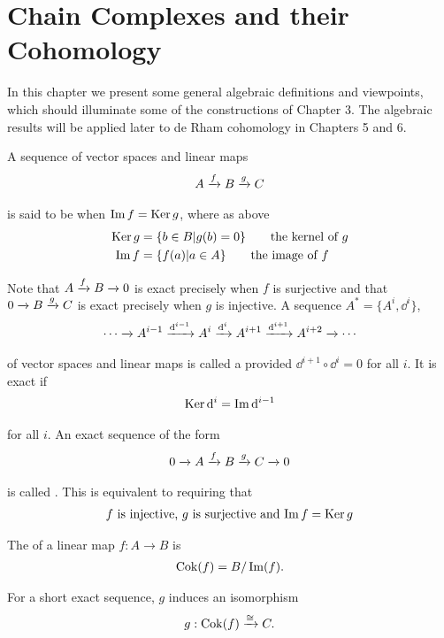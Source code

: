 \chapter{Chain Complexes and their Cohomology}
In this chapter we present some general algebraic definitions and viewpoints,
which should illuminate some of the constructions of Chapter 3. The algebraic
results will be applied later to de Rham cohomology in Chapters 5 and 6.

A sequence of vector spaces and linear maps
\begin{align}\label{eq:4-1}
  A \xrightarrow[]{f} B \xrightarrow[]{g} C
\end{align}

is said to be  when $\operatorname{Im} f = \operatorname{Ker} g$, where as above
\begin{align*}
  \operatorname{Ker} g & = \{b\in B | g(b) = 0\}\qquad \text{the kernel of } g \\
  \operatorname{Im} f  & = \{f(a) | a\in A\}\qquad \text{the image of } f
\end{align*}

Note that $A\xrightarrow[]{f}B\xrightarrow[]{}0$ is exact precisely when $f$ is surjective and that $0\xrightarrow[]{}B\xrightarrow[]{g}C$ is exact
precisely when $g$ is injective. A sequence $A^* = \{A^i, \dd^i\}$,
\begin{align}\label{eq:4-2}
  \cdots \xrightarrow[]{} A^{i-1}\xrightarrow[]{\mathrm{d}^{i-1}} A^i \xrightarrow[]{\mathrm{d}^i} A^{i+1} \xrightarrow[]{\mathrm{d}^{i+1}} A^{i+2}\xrightarrow[]{}\cdots
\end{align}

of vector spaces and linear maps is called a  provided $\dd^{i+1}\circ\dd^i = 0$
for all $i$. It is exact if
\begin{align*}
  \operatorname{Ker} \mathrm{d}^i = \operatorname{Im} \mathrm{d}^{i-1}
\end{align*}

for all $i$. An exact sequence of the form
\begin{align}\label{eq:4-3}
  0\xrightarrow[]{}A\xrightarrow[]{f}B\xrightarrow[]{g}C\xrightarrow[]{}0
\end{align}

is called . This is equivalent to requiring that
\begin{align*}
  \text{$f$ is injective, $g$ is surjective and $\operatorname{Im} f = \operatorname{Ker} g$}
\end{align*}

The  of a linear map $f:A\to B$ is
\begin{align*}
  \operatorname{Cok}(f) = B/\operatorname{Im}(f).
\end{align*}

For a short exact sequence, $g$ induces an isomorphism
\begin{align*}
  g:\operatorname{Cok}(f) \xrightarrow[]{\cong} C.
\end{align*}

